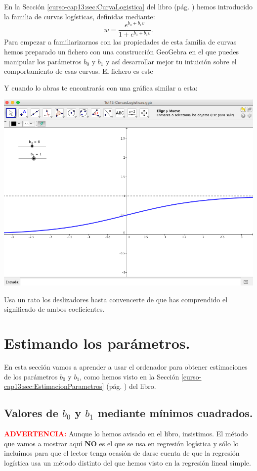 \documentclass[10pt,a4paper]{article}\usepackage[]{graphicx}\usepackage[]{color}
\newcounter {cont01}
\begin{document}
En la Sección \ref{curso-cap13:sec:CurvaLogistica} del libro (pág. \pageref{curso-cap13:sec:CurvaLogistica}) hemos introducido la familia de curvas logísticas, definidas mediante:
\[
  w = \dfrac{e^{b_0+b_1 v}}{1+e^{b_0+b_1 v}}.
\]
Para empezar a familiarizarnos con las propiedades de esta familia de curvas hemos preparado un fichero con una construcción GeoGebra en el que puedes manipular los parámetros $b_0$ y $b_1$ y así desarrollar mejor tu intuición sobre el comportamiento de esas curvas. El fichero es este
\begin{center}
\end{center}
Y cuando lo abras te encontrarás con una gráfica similar a esta:
\begin{center}
    \includegraphics[width=14cm]{../fig/Tut13-CurvasLogisticasGeoGebra.png}
\end{center}
Usa un rato los deslizadores hasta convencerte de que has comprendido el significado de ambos coeficientes.

\section{Estimando los parámetros.}
\label{tut13:sec:EstimandoParametros}

En esta sección vamos a aprender a usar el ordenador para obtener estimaciones de los parámetros $b_0$ y $b_1$, como hemos visto en la Sección \ref{curso-cap13:sec:EstimacionParametros} (pág. \pageref{curso-cap13:sec:EstimacionParametros}) del libro.

\subsection{Valores de $b_0$ y $b_1$  mediante mínimos cuadrados.}
\textcolor{red}{\bf\sc ADVERTENCIA:} Aunque lo hemos avisado en el libro, insistimos. El método que vamos a mostrar aquí {\bf NO} es el que se usa en regresión logística y sólo lo incluimos para que el lector tenga ocasión de darse cuenta de que la regresión logística usa un método distinto del que hemos visto en la regresión lineal simple.
\end{document}
